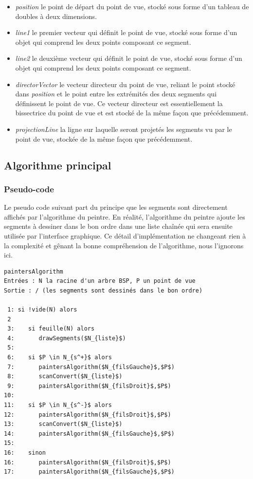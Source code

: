 \documentclass[11pt,a4paper]{article}
\theoremstyle{definition}
\theoremstyle{remark}
\begin{document}
\begin{itemize}
	\item \emph{position} le point de départ du point de vue, stocké sous forme d'un tableau de doubles à deux dimensions.
	\item \emph{line1} le premier vecteur qui définit le point de vue, stocké sous forme d'un objet qui comprend les deux points composant ce segment.
	\item \emph{line2} le deuxième vecteur qui définit le point de vue, stocké sous forme d'un objet qui comprend les deux points composant ce segment.
	\item \emph{directorVector} le vecteur directeur du point de vue, reliant le point stocké dans \emph{position} et le point entre les extrémités des deux segments qui définissent le point de vue. Ce vecteur directeur est essentiellement la bissectrice du point de vue et est stocké de la même façon que précédemment.
	\item \emph{projectionLine} la ligne sur laquelle seront projetés les segments vu par le point de vue, stockée de la même façon que précédemment.
\end{itemize}

\subsection{Algorithme principal}
\subsubsection{Pseudo-code}
Le pseudo code suivant part du principe que les segments sont directement affichés par l'algorithme du peintre. En réalité, l'algorithme du peintre ajoute les segments à dessiner dans le bon ordre dans une liste chaînée qui sera ensuite utilisée par l'interface graphique. Ce détail d'implémentation ne changeant rien à la complexité et gênant la bonne compréhension de l'algorithme, nous l'ignorons ici.\\

\newpage

\begin{lstlisting}
paintersAlgorithm
Entrées : N la racine d'un arbre BSP, P un point de vue
Sortie : / (les segments sont dessinés dans le bon ordre)

 1: si !vide(N) alors
 2
 3:    si feuille(N) alors
 4:       drawSegments($N_{liste}$)
 5:
 6:    si $P \in N_{s^+}$ alors
 7:       paintersAlgorithm($N_{filsGauche}$,$P$)
 8:       scanConvert($N_{liste}$)
 9:       paintersAlgorithm($N_{filsDroit}$,$P$)
10:
11:    si $P \in N_{s^-}$ alors
12:       paintersAlgorithm($N_{filsDroit}$,$P$)
13:       scanConvert($N_{liste}$)
14:       paintersAlgorithm($N_{filsGauche}$,$P$)
15:
16:    sinon
16:       paintersAlgorithm($N_{filsDroit}$,$P$)
17:       paintersAlgorithm($N_{filsGauche}$,$P$)
\end{lstlisting}
\end{document}
